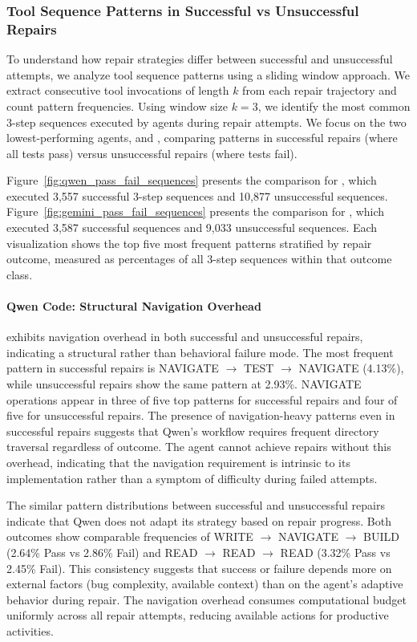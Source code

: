 \subsubsection{Tool Sequence Patterns in Successful vs Unsuccessful Repairs}
\label{sec:tool-sequences}

To understand how repair strategies differ between successful and unsuccessful attempts, we analyze tool sequence patterns using a sliding window approach. We extract consecutive tool invocations of length $k$ from each repair trajectory and count pattern frequencies. Using window size $k=3$, we identify the most common 3-step sequences executed by agents during repair attempts. We focus on the two lowest-performing agents, \qwencode and \geminicli, comparing patterns in successful repairs (where all tests pass) versus unsuccessful repairs (where tests fail).

Figure~\ref{fig:qwen_pass_fail_sequences} presents the comparison for \qwencode, which executed 3,557 successful 3-step sequences and 10,877 unsuccessful sequences. Figure~\ref{fig:gemini_pass_fail_sequences} presents the comparison for \geminicli, which executed 3,587 successful sequences and 9,033 unsuccessful sequences. Each visualization shows the top five most frequent patterns stratified by repair outcome, measured as percentages of all 3-step sequences within that outcome class.

\paragraph{Qwen Code: Structural Navigation Overhead}

\qwencode exhibits navigation overhead in both successful and unsuccessful repairs, indicating a structural rather than behavioral failure mode. The most frequent pattern in successful repairs is NAVIGATE $\rightarrow$ TEST $\rightarrow$ NAVIGATE (4.13\%), while unsuccessful repairs show the same pattern at 2.93\%. NAVIGATE operations appear in three of five top patterns for successful repairs and four of five for unsuccessful repairs. The presence of navigation-heavy patterns even in successful repairs suggests that Qwen's workflow requires frequent directory traversal regardless of outcome. The agent cannot achieve repairs without this overhead, indicating that the navigation requirement is intrinsic to its implementation rather than a symptom of difficulty during failed attempts.

The similar pattern distributions between successful and unsuccessful repairs indicate that Qwen does not adapt its strategy based on repair progress. Both outcomes show comparable frequencies of WRITE $\rightarrow$ NAVIGATE $\rightarrow$ BUILD (2.64\% Pass vs 2.86\% Fail) and READ $\rightarrow$ READ $\rightarrow$ READ (3.32\% Pass vs 2.45\% Fail). This consistency suggests that success or failure depends more on external factors (bug complexity, available context) than on the agent's adaptive behavior during repair. The navigation overhead consumes computational budget uniformly across all repair attempts, reducing available actions for productive activities.

